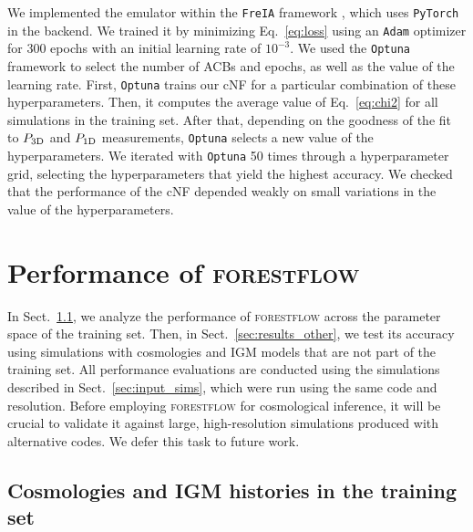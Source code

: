 \documentclass[longauth]{aa}
\newcommand{\poned}{\ensuremath{P_{\rm 1D}}\xspace}
\newcommand{\pthreed}{\ensuremath{P_{\rm 3D}}\xspace}
\newcommand{\forestflow}{\textsc{forestflow}\xspace}
\begin{document}
We implemented the emulator within the \texttt{FreIA} framework \citep{freia}, which uses \texttt{PyTorch} \citep{Ansel_PyTorch_2_Faster_2024} in the backend. We trained it by minimizing Eq.~\ref{eq:loss} using an \texttt{Adam} optimizer \citep{adam_Diederik2015} for 300 epochs with an initial learning rate of $10^{-3}$. We used the \texttt{Optuna} framework \citep{optuna_2019} to select the number of ACBs and epochs, as well as the value of the learning rate. First, \texttt{Optuna} trains our cNF for a particular combination of these hyperparameters. Then, it computes the average value of Eq.~\ref{eq:chi2} for all simulations in the training set. After that, depending on the goodness of the fit to \pthreed and \poned measurements, \texttt{Optuna} selects a new value of the hyperparameters. We iterated with \texttt{Optuna} 50 times through a hyperparameter grid, selecting the hyperparameters that yield the highest accuracy. We checked that the performance of the cNF depended weakly on small variations in the value of the hyperparameters.


\section{Performance of \forestflow}
\label{sec:results}

In Sect.~\ref{sec:results_statistics}, we analyze the performance of \forestflow across the parameter space of the training set. Then, in Sect.~\ref{sec:results_other}, we test its accuracy using simulations with cosmologies and IGM models that are not part of the training set. All performance evaluations are conducted using the simulations described in Sect.~\ref{sec:input_sims}, which were run using the same code and resolution. Before employing \forestflow for cosmological inference, it will be crucial to validate it against large, high-resolution simulations produced with alternative codes. We defer this task to future work.



\subsection{Cosmologies and IGM histories in the training set}
\label{sec:results_statistics}
\end{document}
